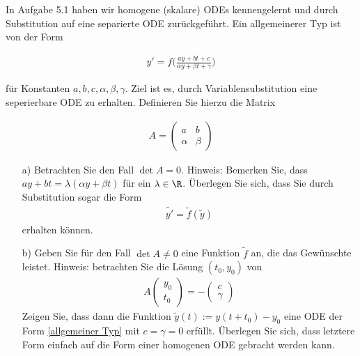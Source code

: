 \begin{exercise}
  In Aufgabe 5.1 haben wir homogene (skalare) ODEs kennengelernt und durch
  Substitution auf eine separierte ODE zurückgeführt. Ein allgemeinerer Typ ist
  von der Form

  \begin{align} \label{allgemeiner Typ}
    y' = f \bigg(\frac{ay + bt + c}{\alpha y + \beta t + \gamma}
    \bigg)
  \end{align}

  für Konstanten $a,b,c,\alpha ,\beta ,\gamma$. Ziel ist es, durch Variablensubstitution
  eine seperierbare ODE zu erhalten. Definieren Sie hierzu die Matrix

  \begin{align*}
    A = \left(
      \begin{array}{cc}
        a & b \\
        \alpha & \beta
      \end{array}
    \right)
  \end{align*}

  \begin{itemize}
    \item[a)] Betrachten Sie den Fall $\det A = 0$. Hinweis: Bemerken Sie, dass
    $ay +bt = \lambda (\alpha y + \beta t)$ für ein $\lambda \in \R$. Überlegen
    Sie sich, dass Sie durch Substitution sogar die Form
    \begin{align*}
      \tilde{y'}=\tilde{f}(\tilde{y})
    \end{align*}
    erhalten können.

    \item[b)] Geben Sie für den Fall $\det A \neq 0$ eine Funktion $\tilde{f}$ an,
    die das Gewünschte leistet. Hinweis: betrachten Sie die Lösung $(t_0 , y_0 )$
    von
    \begin{align*}
      A\left(
      \begin{array}{c}
        y_0 \\
        t_0
      \end{array}
      \right) = -\left(
      \begin{array}{c}
        c \\
        \gamma
      \end{array}
      \right)
    \end{align*}
    Zeigen Sie, dass dann die Funktion $\tilde{y}(t) := y(t + t_0 ) - y_0$ eine
    ODE der Form \eqref{allgemeiner Typ} mit $c = \gamma = 0$ erfüllt. Überlegen
    Sie sich, dass letztere Form einfach auf die Form einer homogenen ODE gebracht
    werden kann.
  \end{itemize}
\end{exercise}

